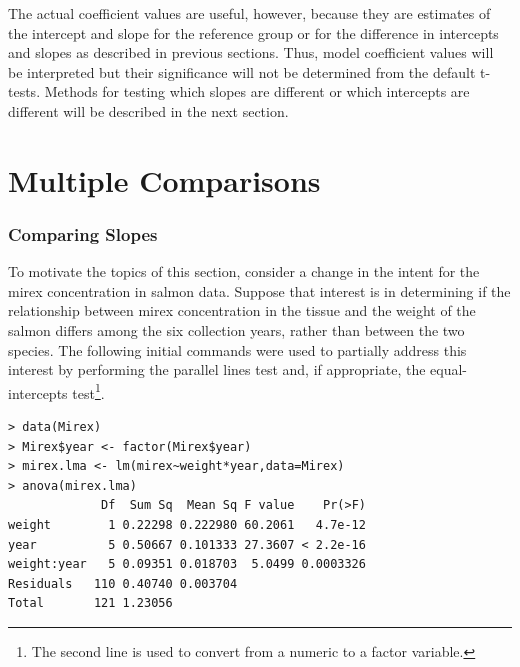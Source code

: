 \documentclass[10pt,openany]{book}\usepackage[]{graphicx}\usepackage[]{color}
\makeatletter
\newenvironment{kframe}{%
 \def\at@end@of@kframe{}%
 \ifinner\ifhmode%
  \def\at@end@of@kframe{\end{minipage}}%
  \begin{minipage}{\columnwidth}%
 \fi\fi%
 \def\FrameCommand##1{\hskip\@totalleftmargin \hskip-\fboxsep
 \colorbox{shadecolor}{##1}\hskip-\fboxsep
     \hskip-\linewidth \hskip-\@totalleftmargin \hskip\columnwidth}%
 \MakeFramed {\advance\hsize-\width
   \@totalleftmargin\z@ \linewidth\hsize
   \@setminipage}}%
 {\par\unskip\endMakeFramed%
 \at@end@of@kframe}
\newenvironment{knitrout}{}{} %
\makeatother
\begin{document}

\vspace{-12pt}

The actual coefficient values are useful, however, because they are estimates of the intercept and slope for the reference group or for the difference in intercepts and slopes as described in previous sections.  Thus, model coefficient values will be interpreted but their significance will not be determined from the default t-tests.  Methods for testing which slopes are different or which intercepts are different will be described in the next section.



\section{Multiple Comparisons} \label{sect:IVRMultComparisons}
\subsubsection*{Comparing Slopes}
To motivate the topics of this section, consider a change in the intent for the mirex concentration in salmon data.  Suppose that interest is in determining if the relationship between mirex concentration in the tissue and the weight of the salmon differs among the six collection years, rather than between the two species.  The following initial commands were used to partially address this interest by performing the parallel lines test and, if appropriate, the equal-intercepts test\footnote{The second line is used to convert  from a numeric to a factor variable.}.

\begin{knitrout}
\color{fgcolor}\begin{kframe}
\begin{verbatim}
> data(Mirex)
> Mirex$year <- factor(Mirex$year)
> mirex.lma <- lm(mirex~weight*year,data=Mirex)
> anova(mirex.lma)
             Df  Sum Sq  Mean Sq F value    Pr(>F)
weight        1 0.22298 0.222980 60.2061   4.7e-12
year          5 0.50667 0.101333 27.3607 < 2.2e-16
weight:year   5 0.09351 0.018703  5.0499 0.0003326
Residuals   110 0.40740 0.003704                  
Total       121 1.23056                           
\end{verbatim}
\end{kframe}
\end{knitrout}
\end{document}
